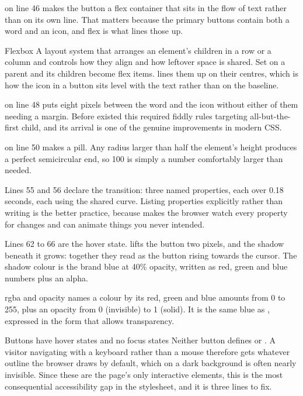  on line 46 makes the button a flex container that sits
in the flow of text rather than on its own line. That matters because the primary
buttons contain both a word and an icon, and flex is what lines those up.

\begin{jargon}{Flexbox}
A layout system that arranges an element's children in a row or a column and
controls how they align and how leftover space is shared. Set
 on a parent and its children become flex items.
 lines them up on their centres, which is how the icon
in a button sits level with the text rather than on the baseline.
\end{jargon}

 on line 48 puts eight pixels between the word and the icon
without either of them needing a margin. Before  existed this required
fiddly rules targeting all-but-the-first child, and its arrival is one of the
genuine improvements in modern CSS.

 on line 50 makes a pill. Any radius larger than half
the element's height produces a perfect semicircular end, so 100 is simply a
number comfortably larger than needed.

Lines 55 and 56 declare the transition: three named properties, each over 0.18
seconds, each using the shared curve. Listing properties explicitly rather than
writing  is the better practice, because  makes
the browser watch every property for changes and can animate things you never
intended.

Lines 62 to 66 are the hover state.  lifts the
button two pixels, and the shadow beneath it grows: together they read as the
button rising towards the cursor. The shadow colour  is
the brand blue at 40\% opacity, written as red, green and blue numbers plus an
alpha.

\begin{jargon}{rgba and opacity}
 names a colour by its red, green and blue amounts from
0 to 255, plus an opacity from 0 (invisible) to 1 (solid). It is the same blue as
, expressed in the form that allows transparency.
\end{jargon}

\begin{honest}{Buttons have hover states and no focus states}
Neither button defines  or . A visitor
navigating with a keyboard rather than a mouse therefore gets whatever outline the
browser draws by default, which on a dark background is often nearly invisible.
Since these are the page's only interactive elements, this is the most consequential
accessibility gap in the stylesheet, and it is three lines to fix.
\end{honest}

